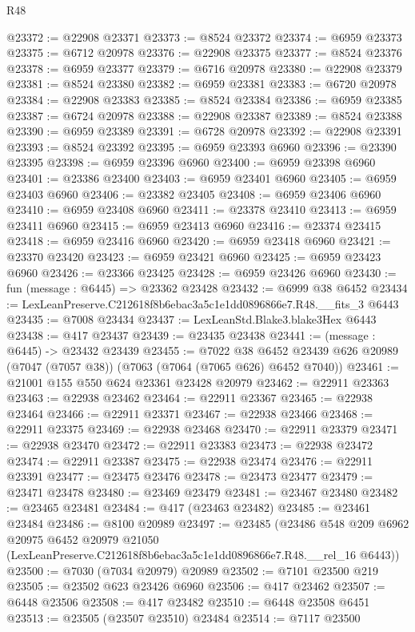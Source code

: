 \begin{lexlean}{R48}
\begin{coremodule}
@23372 := @22908 @23371
@23373 := @8524 @23372
@23374 := @6959 @23373
@23375 := @6712 @20978
@23376 := @22908 @23375
@23377 := @8524 @23376
@23378 := @6959 @23377
@23379 := @6716 @20978
@23380 := @22908 @23379
@23381 := @8524 @23380
@23382 := @6959 @23381
@23383 := @6720 @20978
@23384 := @22908 @23383
@23385 := @8524 @23384
@23386 := @6959 @23385
@23387 := @6724 @20978
@23388 := @22908 @23387
@23389 := @8524 @23388
@23390 := @6959 @23389
@23391 := @6728 @20978
@23392 := @22908 @23391
@23393 := @8524 @23392
@23395 := @6959 @23393 @6960
@23396 := @23390 @23395
@23398 := @6959 @23396 @6960
@23400 := @6959 @23398 @6960
@23401 := @23386 @23400
@23403 := @6959 @23401 @6960
@23405 := @6959 @23403 @6960
@23406 := @23382 @23405
@23408 := @6959 @23406 @6960
@23410 := @6959 @23408 @6960
@23411 := @23378 @23410
@23413 := @6959 @23411 @6960
@23415 := @6959 @23413 @6960
@23416 := @23374 @23415
@23418 := @6959 @23416 @6960
@23420 := @6959 @23418 @6960
@23421 := @23370 @23420
@23423 := @6959 @23421 @6960
@23425 := @6959 @23423 @6960
@23426 := @23366 @23425
@23428 := @6959 @23426 @6960
@23430 := fun (message : @6445) => @23362 @23428
@23432 := @6999 @38 @6452
@23434 := LexLeanPreserve.C212618f8b6ebac3a5c1e1dd0896866e7.R48.__fits_3 @6443
@23435 := @7008 @23434
@23437 := LexLeanStd.Blake3.blake3Hex @6443
@23438 := @417 @23437
@23439 := @23435 @23438
@23441 := (message : @6445) -> @23432 @23439
@23455 := @7022
    @38
    @6452
    @23439
    @626
    @20989
    (@7047 (@7057 @38))
    (@7063 (@7064 (@7065 @626) @6452 @7040))
@23461 := @21001 @155 @550 @624 @23361 @23428 @20979
@23462 := @22911 @23363
@23463 := @22938 @23462
@23464 := @22911 @23367
@23465 := @22938 @23464
@23466 := @22911 @23371
@23467 := @22938 @23466
@23468 := @22911 @23375
@23469 := @22938 @23468
@23470 := @22911 @23379
@23471 := @22938 @23470
@23472 := @22911 @23383
@23473 := @22938 @23472
@23474 := @22911 @23387
@23475 := @22938 @23474
@23476 := @22911 @23391
@23477 := @23475 @23476
@23478 := @23473 @23477
@23479 := @23471 @23478
@23480 := @23469 @23479
@23481 := @23467 @23480
@23482 := @23465 @23481
@23484 := @417 (@23463 @23482)
@23485 := @23461 @23484
@23486 := @8100 @20989
@23497 := @23485
    (@23486
      @548
      @209
      @6962
      @20975
      @6452
      @20979
      @21050
      (LexLeanPreserve.C212618f8b6ebac3a5c1e1dd0896866e7.R48.__rel_16 @6443))
@23500 := @7030 (@7034 @20979) @20989
@23502 := @7101 @23500 @219
@23505 := @23502 @623 @23426 @6960
@23506 := @417 @23462
@23507 := @6448 @23506
@23508 := @417 @23482
@23510 := @6448 @23508 @6451
@23513 := @23505 (@23507 @23510) @23484
@23514 := @7117 @23500

\end{coremodule}
\end{lexlean}
